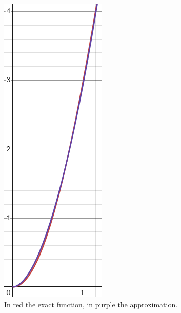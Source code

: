 \documentclass{PoliMi_MasterThesis}
\begin{document}
\begin{figure}[H]
    \includegraphics[width=\textwidth*\real{0.2}]{Images/norm_factor_approx.png} 
    \caption{In red the exact function, in purple the approximation.}
    \label{fig:normalization_factor_approx}
\end{figure}
\end{document}
